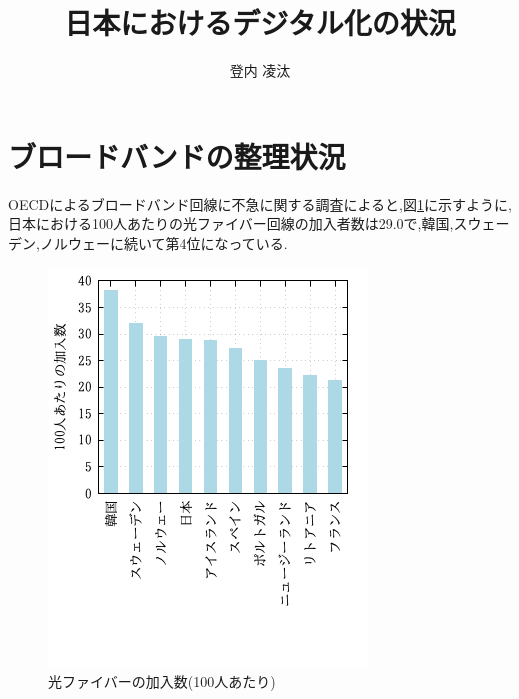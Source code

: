 \documentclass[a4paper,11pt,dvipdfmx]{ujarticle}
\title{日本におけるデジタル化の状況}
\author{登内 凌汰}
\begin{document}
\maketitle %


\section{ブロードバンドの整理状況}


OECDによるブロードバンド回線に不急に関する調査\cite{oecd}によると,図\ref{fig:a}に示すように,
日本における100人あたりの光ファイバー回線の加入者数は29.0で,韓国,スウェーデン,ノルウェーに続いて第4位になっている.

\begin{figure}[htbp]
    \centering
    \includegraphics{fig11.png}
    \caption{光ファイバーの加入数(100人あたり)}\label{fig:a}
\end{figure}

\end{document}
